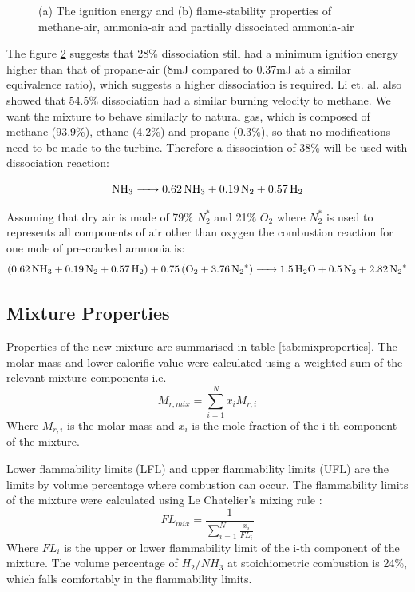 \documentclass[11pt, oneside]{article}
\begin{document}
\begin{figure} [h]
\begin{subfigure}{.5\textwidth}
  \label{fig:sub2}
\end{subfigure}
\caption{(a) The ignition energy and (b) flame-stability properties of methane-air, ammonia-air and partially dissociated ammonia-air \cite{verkamp}}
\label{fig:mixproperties2}
\end{figure} %

The figure \ref{fig:mixproperties2} suggests that 28\% dissociation still had a minimum ignition energy higher than that of propane-air (8mJ compared to 0.37mJ at a similar equivalence ratio), which suggests a higher dissociation is required. Li et. al. \cite{junli} also showed that 54.5\% dissociation had a similar burning velocity to methane. We want the mixture to behave similarly to natural gas, which is composed of methane (93.9\%), ethane (4.2\%) and propane (0.3\%), so that no modifications need to be made to the turbine. Therefore a dissociation of 38\% will be used with dissociation reaction:

\begin{equation}
\ce{NH_3 -> 0.62 NH_3 + 0.19 N_2 + 0.57 H_2}
\end{equation}

Assuming that dry air is made of 79\% $N_2^*$ and 21\% $O_2$ where $N_2^*$ is used to represents all components of air other than oxygen the combustion reaction for one mole of pre-cracked ammonia is:
\begin{equation}
\ce{(0.62 NH_3 + 0.19 N_2 + 0.57 H_2) + 0.75(O_2 + 3.76 N_2^*) ->1.5H_2O + 0.5N_2 + 2.82N_2^*}
\end{equation}

\subsection {Mixture Properties}
Properties of the new mixture are summarised in table \ref{tab:mixproperties}. The molar mass and lower calorific value were calculated using a weighted sum of the relevant mixture components i.e.
\begin{equation}
M_{r, mix} = \sum_{i=1}^{N} x_i M_{r,i}
\end{equation}
Where $M_{r, i}$ is the molar mass and $x_i$ is the mole fraction of the i-th component of the mixture. 

Lower flammability limits (LFL) and upper flammability limits (UFL) are the limits by volume percentage where combustion can occur. The flammability limits of the mixture were calculated using Le Chatelier's mixing rule \cite{chat}: 
\begin{equation}
FL_{mix} = \frac{1}{\sum_{i=1}^{N} \frac{x_i}{FL_i}}
\end{equation}
Where $FL_{i}$ is the upper or lower flammability limit of the i-th component of the mixture. The volume percentage of $H_2/NH_3$ at stoichiometric combustion is 24\%, which falls comfortably in the flammability limits.
\end{document}
